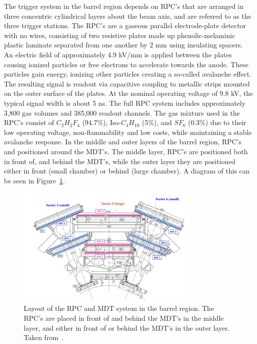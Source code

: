 The trigger system in the barrel region depends on RPC's that are arranged in three concentric cylindrical layers about the beam axis, and are referred to as the three trigger stations. The RPC's are a gaseous parallel electrode-plate detector with no wires, consisting of two resistive plates made up phenolic-melaminic plastic laminate separated from one another by 2 mm using insulating spacers. An electric field of approximately 4.9 kV/mm is applied between the plates causing ionized particles or free electrons to accelerate towards the anode. These particles gain energy, ionizing other particles creating a so-called avalanche effect. The resulting signal is readout via capacitive coupling to metallic strips mounted on the outer surface of the plates. At the nominal operating voltage of 9.8 kV, the typical signal width is about 5 ns. The full RPC system includes approximately 3,800 gas volumes and 385,000 readout channels. The gas mixture used in the RPC's consist of $C_2H_2F_4$ (94.7\%), Iso-$C_4H_{10}$ (5\%), and $SF_6$ (0.3\%) due to their low operating voltage, non-flammability and low costs, while maintaining a stable avalanche response. In the middle and outer layers of the barrel region, RPC's and positioned around the MDT's. The middle layer, RPC's are positioned both in front of, and behind the MDT's, while the outer layer they are positioned either in front (small chamber) or behind (large chamber). A diagram of this can be seen in Figure~\ref{fig:atlas_mdt_rpc_sandwich}.

\begin{figure}[htp]
    \centering
    \includegraphics[width=0.8\textwidth]{figures/atlas/atlas_mdt_rpc_sandwich.png}
    \caption{Layout of the RPC and MDT system in the barrel region. The RPC's are placed in front of and behind the MDT's in the middle layer, and either in front of or behind the MDT's in the outer layer. Taken from~\cite{atlas_collaboration_paper}.}\label{fig:atlas_mdt_rpc_sandwich}
\end{figure}
